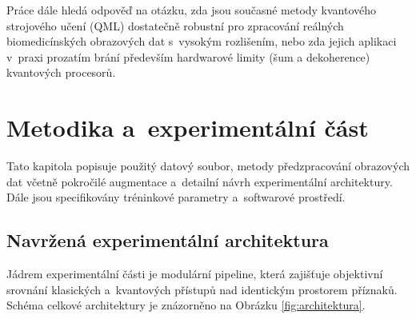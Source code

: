\documentclass[12pt, a4paper]{report}
\begin{document}
Práce dále hledá odpověď na otázku, zda jsou současné metody kvantového
strojového učení (QML) dostatečně robustní pro zpracování reálných
biomedicínských obrazových dat s~vysokým rozlišením, nebo zda jejich
aplikaci v~praxi prozatím brání především hardwarové limity (šum a
dekoherence) kvantových procesorů.

\chapter{Metodika a~experimentální část} \label{chap:metodika}

Tato kapitola popisuje použitý datový soubor, metody předzpracování obrazových dat včetně pokročilé augmentace a~detailní návrh experimentální architektury. Dále jsou specifikovány tréninkové parametry a~softwarové prostředí.

\section{Navržená experimentální architektura} \label{sec:architektura}

Jádrem experimentální části je modulární pipeline, která zajišťuje objektivní srovnání klasických a~kvantových přístupů nad identickým prostorem příznaků. Schéma celkové architektury je znázorněno na Obrázku \ref{fig:architektura}.
\end{document}
